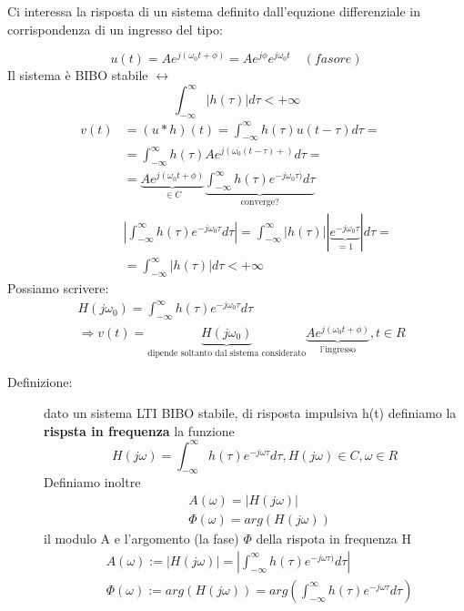 \documentclass[a4paper, 12pt]{book}
\theoremstyle{plain}
\begin{document}
Ci interessa la risposta di un sistema definito dall'equzione differenziale
in corrispondenza di un ingresso del tipo: 

\[
    u(t) = A e^{j(\omega_0t + \phi)} = A e^{j\phi} e^{j\omega_0t} \quad (fasore)
\]
Il sistema è BIBO stabile $\leftrightarrow$ 
\[
    \int_{-\infty}^\infty |h(\tau)| d\tau < +\infty
\]
\[
\begin{split}
    v(t) &= (u \ast h)(t) = \int_{-\infty}^\infty h(\tau) u(t - \tau) d\tau = \\
    &= \int_{-\infty}^\infty h(\tau) A e^{j(\omega_0(t - \tau) +)} d\tau = \\
    &= \underbrace{A e^{j(\omega_0t + \phi)}}_{\in C} \underbrace{\int_{-\infty}^\infty h(\tau) e^{-j\omega_0\tau)} d\tau}_{\textrm{converge?}} \\
    &|\int_{-\infty}^\infty h(\tau) e^{-j\omega_0\tau} d\tau| = \int_{-\infty}^\infty |h(\tau)| |\underbrace{e^{-j \omega_0 \tau}}_{= 1}| d\tau = \\
    &= \int_{-\infty}^\infty |h(\tau)| d\tau < +\infty
\end{split}
\]
Possiamo scrivere:
\[
    \begin{split}
        &H(j\omega_0) = \int_{-\infty}^\infty h(\tau) e^{-j\omega_0 \tau} d\tau \\
        &\Rightarrow v(t) = \underbrace{H(j\omega_0)}_{\textrm{dipende soltanto dal sistema considerato}} \underbrace{A e^{j(\omega_0 t + \phi)}}_{\textrm{l'ingresso}}, t \in R
    \end{split}
\]
\begin{description}
    \item[Definizione:] dato un sistema LTI BIBO stabile, di risposta impulsiva h(t) definiamo la \textbf{rispsta in frequenza} la 
    funzione \[ H(j\omega) =   \int_{-\infty}^\infty h(\tau) e^{-j\omega \tau} d\tau, H(j\omega) \in C, \omega \in R \] Definiamo inoltre
    \[ \begin{split}
        &A(\omega) = |H(j\omega)| \\
        &\Phi(\omega) = arg(H(j\omega))
    \end{split}
    \] il modulo A e l'argomento (la fase) $\Phi$ della rispota in frequenza H 
    \[\begin{split}
        &A(\omega) := |H(j\omega)| = |\int_{-\infty}^\infty h(\tau) e^{-j\omega \tau)} d\tau| \\
        &\Phi(\omega) := arg(H(j\omega)) = arg(\int_{-\infty}^\infty h(\tau) e^{-j\omega \tau} d\tau)
    \end{split}
    \]
\end{description}
\end{document}
